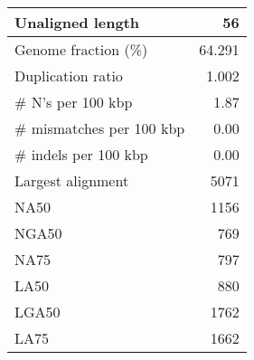 \documentclass[12pt,a4paper]{article}
\begin{document}
\begin{table}[ht]
\begin{center}
\begin{tabular}{|l*{1}{|r}|}
Unaligned length & 56 \\ \hline
Genome fraction (\%) & 64.291 \\ \hline
Duplication ratio & 1.002 \\ \hline
\# N's per 100 kbp & 1.87 \\ \hline
\# mismatches per 100 kbp & 0.00 \\ \hline
\# indels per 100 kbp & 0.00 \\ \hline
Largest alignment & 5071 \\ \hline
NA50 & 1156 \\ \hline
NGA50 & 769 \\ \hline
NA75 & 797 \\ \hline
LA50 & 880 \\ \hline
LGA50 & 1762 \\ \hline
LA75 & 1662 \\ \hline
\end{tabular}
\end{center}
\end{table}
\end{document}
